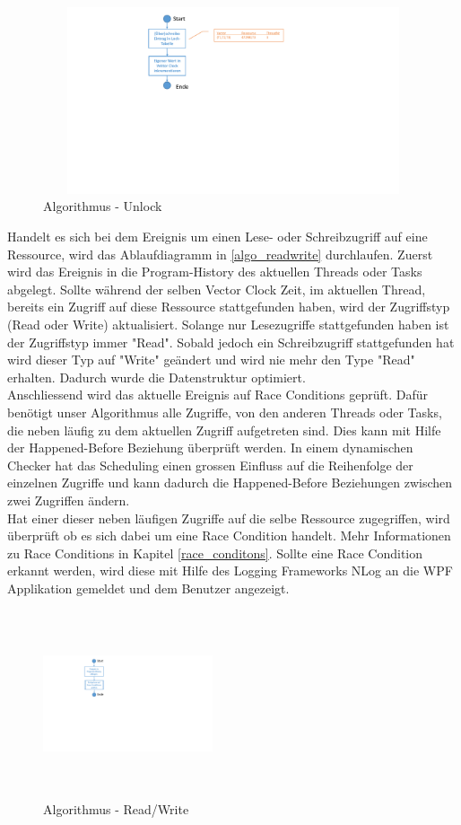 \documentclass[10pt,a4paper]{article}
\begin{document}
\begin{flushleft}
\begin{figure}[H]
\centering
	\includegraphics[width=12cm,height=5.5cm,trim=70mm 106mm 100mm 8mm, clip]{images/Unlock.pdf}
\caption{Algorithmus - Unlock}\label{algo_unlock}
\end{figure}
Handelt es sich bei dem Ereignis um einen Lese- oder Schreibzugriff auf eine Ressource, wird das Ablaufdiagramm in \autoref{algo_readwrite} durchlaufen. Zuerst wird das Ereignis in die Program-History des aktuellen Threads oder Tasks abgelegt. Sollte während der selben Vector Clock Zeit, im aktuellen Thread, bereits ein Zugriff auf diese Ressource stattgefunden haben, wird der Zugriffstyp (Read oder Write) aktualisiert. Solange nur Lesezugriffe stattgefunden haben ist der Zugriffstyp immer "Read". Sobald jedoch ein Schreibzugriff stattgefunden hat wird dieser Typ auf "Write" geändert und wird nie mehr den Type "Read" erhalten. Dadurch wurde die Datenstruktur optimiert.\\
Anschliessend wird das aktuelle Ereignis auf Race Conditions geprüft. Dafür benötigt unser Algorithmus alle Zugriffe, von den anderen Threads oder Tasks, die neben läufig zu dem aktuellen Zugriff aufgetreten sind. Dies kann mit Hilfe der Happened-Before Beziehung überprüft werden. In einem dynamischen Checker hat das Scheduling einen grossen Einfluss auf die Reihenfolge der einzelnen Zugriffe und kann dadurch die Happened-Before Beziehungen zwischen zwei Zugriffen ändern.\\
Hat einer dieser neben läufigen Zugriffe auf die selbe Ressource zugegriffen, wird überprüft ob es sich dabei um eine Race Condition handelt. Mehr Informationen zu Race Conditions in Kapitel \ref{race_conditons}. Sollte eine Race Condition erkannt werden, wird diese mit Hilfe des Logging Frameworks NLog an die WPF Applikation gemeldet und dem Benutzer angezeigt.
\begin{figure}[H]
\centering
	\includegraphics[width=5cm,height=5.5cm,trim=70mm 108mm 200mm 7mm, clip]{images/ReadWrite.pdf}
\caption{Algorithmus - Read/Write}\label{algo_readwrite}
\end{figure}
\end{flushleft}
\end{document}

